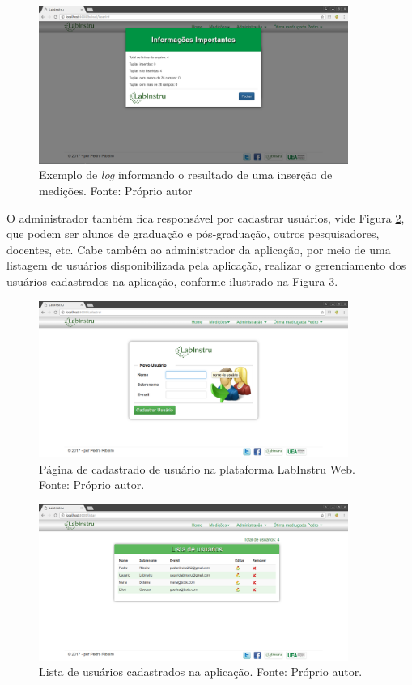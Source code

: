 \begin{figure}[h!]
	\centering
	\includegraphics[width=0.9\textwidth]{./img/ap13.png}
	\caption{Exemplo de \emph{log} informando o resultado de uma inserção de medições. Fonte: Próprio autor} \label{fig:ap13}
\end{figure}

\newpage

O administrador também fica responsável por cadastrar usuários, vide Figura \ref{fig:ap4}, que podem ser alunos de graduação e pós-graduação, outros pesquisadores, docentes, etc. Cabe também ao administrador da aplicação, por meio de uma listagem de usuários disponibilizada pela aplicação, realizar o gerenciamento dos usuários cadastrados na aplicação, conforme ilustrado na Figura \ref{fig:ap14}.

\begin{figure}[h!]
	\centering
	\includegraphics[width=0.9\textwidth]{./img/ap4.png}
	\caption{Página de cadastrado de usuário na plataforma LabInstru Web. Fonte: Próprio autor.} \label{fig:ap4}
\end{figure}

\begin{figure}[h!]
	\centering
	\includegraphics[width=0.9\textwidth]{./img/ap14.png}
	\caption{Lista de usuários cadastrados na aplicação. Fonte: Próprio autor.} \label{fig:ap14}
\end{figure}

